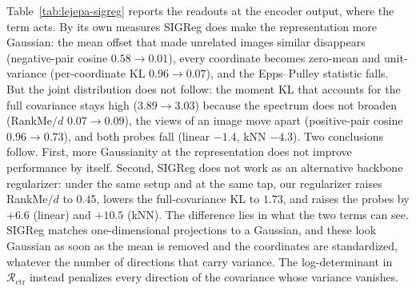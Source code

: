 Table~\ref{tab:lejepa-sigreg} reports the readouts at the encoder output, where the term acts. By its own measures SIGReg does make the representation more Gaussian: the mean offset that made unrelated images similar disappears (negative-pair cosine $0.58\to0.01$), every coordinate becomes zero-mean and unit-variance (per-coordinate KL $0.96\to0.07$), and the Epps--Pulley statistic falls. But the joint distribution does not follow: the moment KL that accounts for the full covariance stays high ($3.89\to3.03$) because the spectrum does not broaden (RankMe$/d$ $0.07\to0.09$), the views of an image move apart (positive-pair cosine $0.96\to0.73$), and both probes fall (linear $-1.4$, kNN $-4.3$). Two conclusions follow. First, more Gaussianity at the representation does not improve performance by itself. Second, SIGReg does not work as an alternative backbone regularizer: under the same setup and at the same tap, our regularizer raises RankMe$/d$ to $0.45$, lowers the full-covariance KL to $1.73$, and raises the probes by $+6.6$ (linear) and $+10.5$ (kNN). The difference lies in what the two terms can see. SIGReg matches one-dimensional projections to a Gaussian, and these look Gaussian as soon as the mean is removed and the coordinates are standardized, whatever the number of directions that carry variance. The log-determinant in $\mathcal R_{\mathrm{ctr}}$ instead penalizes every direction of the covariance whose variance vanishes.

